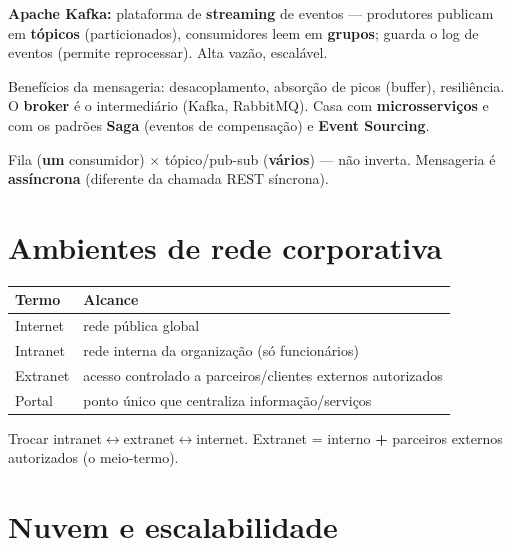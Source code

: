 \textbf{Apache Kafka:} plataforma de \textbf{streaming} de eventos ---
produtores publicam em \textbf{tópicos} (particionados), consumidores leem
em \textbf{grupos}; guarda o log de eventos (permite reprocessar). Alta
vazão, escalável.

Benefícios da mensageria: desacoplamento, absorção de picos (buffer),
resiliência. O \textbf{broker} é o intermediário (Kafka, RabbitMQ). Casa com
\textbf{microsserviços} e com os padrões \textbf{Saga} (eventos de
compensação) e \textbf{Event Sourcing}.

\begin{pegadinha}
Fila (\textbf{um} consumidor) $\times$ tópico/pub-sub (\textbf{vários}) ---
não inverta. Mensageria é \textbf{assíncrona} (diferente da chamada REST
síncrona).
\end{pegadinha}

\section{Ambientes de rede corporativa}

\begin{center}
\begin{tabular}{@{}p{2.4cm}p{9cm}@{}}
\toprule
\textbf{Termo} & \textbf{Alcance} \\
\midrule
Internet & rede pública global \\
Intranet & rede interna da organização (só funcionários) \\
Extranet & acesso controlado a parceiros/clientes externos autorizados \\
Portal & ponto único que centraliza informação/serviços \\
\bottomrule
\end{tabular}
\end{center}

\begin{pegadinha}
Trocar intranet$\leftrightarrow$extranet$\leftrightarrow$internet. Extranet =
interno \textbf{+} parceiros externos autorizados (o meio-termo).
\end{pegadinha}

\section{Nuvem e escalabilidade}
\label{sec:nuvem}

